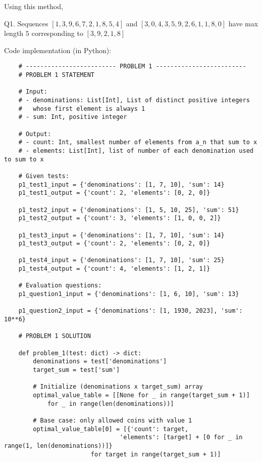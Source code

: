 \documentclass[12pt]{article}
\newenvironment*{proof}[1][blue]{
    \begin{tcolorbox}[
        parbox=false,
        colback=#1!5!white,
        colframe=#1!75!black,
        coltext=#1,
        breakable
    ]}
    {\end{tcolorbox}}
\begin{document}
        Using this method, 
        \begin{proof}
            Q1. Sequences $[1, 3, 9, 6, 7, 2, 1, 8, 5, 4]$ and $[3, 0, 4, 3, 5, 9, 2, 6, 1, 1, 8, 0]$ have max length $5$ corresponding to $[3, 9, 2, 1, 8]$ 
        \end{proof}
        \color{black}

\pagebreak 

Code implementation (in Python):
\begin{verbatim}
    # ------------------------- PROBLEM 1 -------------------------
    # PROBLEM 1 STATEMENT

    # Input: 
    # - denominations: List[Int], List of distinct positive integers 
    #   whose first element is always 1
    # - sum: Int, positive integer

    # Output:
    # - count: Int, smallest number of elements from a_n that sum to x
    # - elements: List[Int], list of number of each denomination used to sum to x

    # Given tests:
    p1_test1_input = {'denominations': [1, 7, 10], 'sum': 14}
    p1_test1_output = {'count': 2, 'elements': [0, 2, 0]}

    p1_test2_input = {'denominations': [1, 5, 10, 25], 'sum': 51}
    p1_test2_output = {'count': 3, 'elements': [1, 0, 0, 2]}

    p1_test3_input = {'denominations': [1, 7, 10], 'sum': 14}
    p1_test3_output = {'count': 2, 'elements': [0, 2, 0]}

    p1_test4_input = {'denominations': [1, 7, 10], 'sum': 25}
    p1_test4_output = {'count': 4, 'elements': [1, 2, 1]}

    # Evaluation questions:
    p1_question1_input = {'denominations': [1, 6, 10], 'sum': 13}

    p1_question2_input = {'denominations': [1, 1930, 2023], 'sum': 10**6}

    # PROBLEM 1 SOLUTION

    def problem_1(test: dict) -> dict:
        denominations = test['denominations']
        target_sum = test['sum']
            
        # Initialize (denominations x target_sum) array
        optimal_value_table = [[None for _ in range(target_sum + 1)] 
            for _ in range(len(denominations))]

        # Base case: only allowed coins with value 1 
        optimal_value_table[0] = [{'count': target, 
                                'elements': [target] + [0 for _ in range(1, len(denominations))]} 
                        for target in range(target_sum + 1)]


\end{verbatim}
\end{document}
